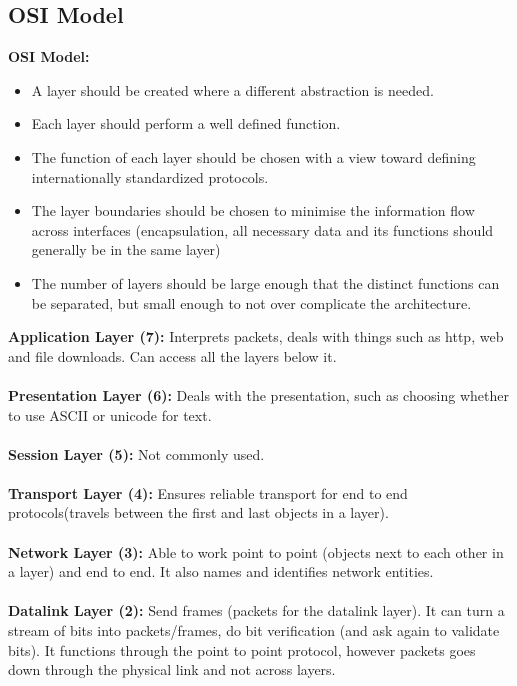 \documentclass[a4paper,10pt]{article}
\begin{document}
\subsection{OSI Model}
\textcolor{TealBlue}{\textbf{OSI Model:}}
\begin{itemize}
	\item A layer should be created where a different abstraction is needed. 
	\item Each layer should perform a well defined function. 
	\item The function of each layer should be chosen with a view toward defining internationally standardized protocols. 
	\item The layer boundaries should be chosen to minimise the information flow across interfaces (encapsulation, all necessary data and its functions should generally be in the same layer)
	\item The number of layers should be large enough that the distinct functions can be separated, but small enough to not over complicate the architecture. 
\end{itemize}
\textcolor{TealBlue}{\textbf{Application Layer (7):}} Interprets packets, deals with things such as http, web and file downloads. Can access all the layers below it. \\\\
\textcolor{TealBlue}{\textbf{Presentation Layer (6):}} Deals with the presentation, such as choosing whether to use ASCII or unicode for text. \\\\
\textcolor{TealBlue}{\textbf{Session Layer (5):}} Not commonly used. \\\\
\textcolor{TealBlue}{\textbf{Transport Layer (4):}} Ensures reliable transport for end to end protocols(travels between the first and last objects in a layer). \\\\
\textcolor{TealBlue}{\textbf{Network Layer (3):}} Able to work point to point (objects next to each other in a layer) and end to end. It also names and identifies network entities. \\\\
\textcolor{TealBlue}{\textbf{Datalink Layer (2):}} Send frames (packets for the datalink layer). It can turn a stream of bits into packets/frames, do bit verification (and ask again to validate bits). It functions through the point to point protocol, however packets goes down through the physical link and not across layers. \\\\
\end{document}
